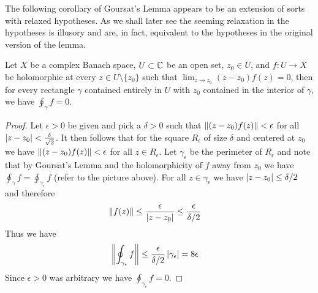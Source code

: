 The following corollary of Goursat's Lemma appears to be an extension of sorts with relaxed hypotheses.   As we shall later see the seeming relaxation in the hypotheses is illusory and are, in fact, equivalent to the hypotheses in the original version of the lemma.
\begin{cor}\label{banach:GoursatLemmaPunctured}Let $X$ be a complex Banach space, $U \subset \mathbb{C}$ be an open set, $z_0 \in U$, and $f : U \to X$ be holomorphic at every $z \in U \setminus \lbrace z_0 \rbrace$ such that $\lim_{z \to z_0} (z - z_0) f(z) = 0$, then for every rectangle $\gamma$ contained entirely in $U$ with $z_0$ contained in the interior of $\gamma$, we have $\oint_\gamma f = 0$.   
\end{cor}
\begin{proof}
  Let $\epsilon>0$ be given and pick a $\delta>0$ such that $\left \lVert (z-z_0) f(z) \right \rVert < \epsilon$ for all $\left \vert z-z_0 \right \vert < \frac{\delta}{\sqrt{2}}$.   It then follows that for the square $R_\epsilon$ of size $\delta$ and centered at $z_0$ we have $\left \lVert (z-z_0) f(z) \right \rVert < \epsilon$ for all $z \in R_\epsilon$.   Let $\gamma_\epsilon$ be the perimeter of $R_\epsilon$ and note that by Goursat's Lemma and the holomorphicity of $f$ away from $z_0$ we have $\oint_\gamma f = \oint_{\gamma_\epsilon} f$ (refer to the picture above).   For all $z \in \gamma_\epsilon$ we have $\left \vert z-z_0 \right \vert \leq \delta/2$ and therefore
  \begin{align*}
    \left \lVert f(z) \right \rVert &\leq \frac{\epsilon}{\left \vert z - z_0 \right \vert} \leq \frac{\epsilon}{\delta/2}
  \end{align*}
  Thus we have
  \begin{align*}
    \left \lVert \oint_{\gamma_\epsilon} f \right \rVert &\leq \frac{\epsilon}{\delta/2} \left \vert \gamma_\epsilon \right \vert = 8 \epsilon
  \end{align*}
Since $\epsilon>0$ was arbitrary we have $\oint_{\gamma_\epsilon} f = 0$.
\end{proof}

